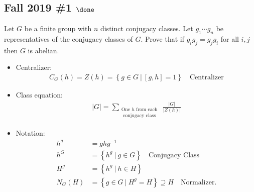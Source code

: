 \hypertarget{fall-2019-1-done}{%
\subsection{\texorpdfstring{Fall 2019 \#1
\(\done\)}{Fall 2019 \#1 \textbackslash done}}\label{fall-2019-1-done}}

Let \(G\) be a finite group with \(n\) distinct conjugacy classes. Let
\(g_1 \cdots g_n\) be representatives of the conjugacy classes of \(G\).
Prove that if \(g_i g_j = g_j g_i\) for all \(i, j\) then \(G\) is
abelian.

\begin{concept}

\envlist

\begin{itemize}
\tightlist
\item
  Centralizer:
  \begin{align*}
  C_G(h) = Z(h) = \left\{{g\in G {~\mathrel{\Big|}~}[g,h] = 1}\right\}
  \quad\text{Centralizer}
  \end{align*}
\item
  Class equation:
  \begin{align*}
  {\left\lvert {G} \right\rvert} = \sum_{\substack{\text{One $h$ from each } \\ \text{ conjugacy class}}} \frac{{\left\lvert {G} \right\rvert}}{{\left\lvert {Z(h)} \right\rvert}}
  \end{align*}
\item
  Notation:
  \begin{align*}
  h^g &= ghg^{-1}\\
  h^G &= \left\{{ h^g {~\mathrel{\Big|}~}g\in G}\right\} \quad\text{Conjugacy Class}\\
  H^g &= \left\{{h^g {~\mathrel{\Big|}~}h\in H}\right\} \\
  N_G(H) &= \left\{{g\in G {~\mathrel{\Big|}~}H^g = H}\right\} \supseteq H \quad\text{Normalizer}
  .\end{align*}
\end{itemize}

\end{concept}

